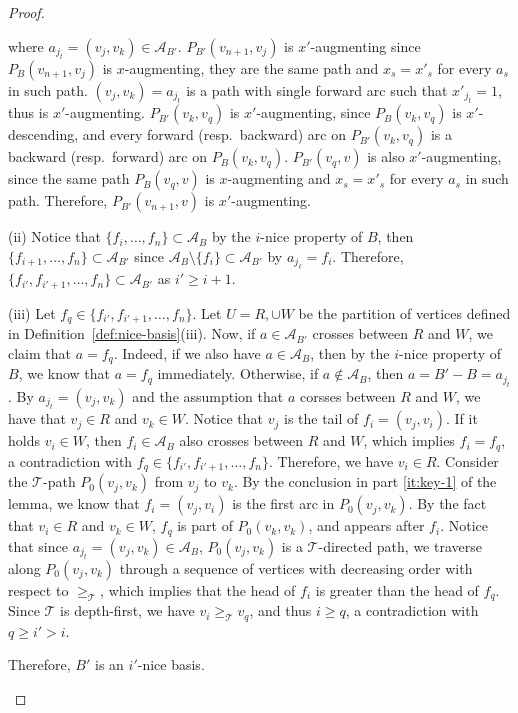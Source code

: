 \documentclass[11pt]{article}
\begin{document}
\begin{proof}
\begin{enumerate}
    where $a_{j_t}=(v_j,v_k)\in\mathcal{A}_{B'}$. $P_{B'}(v_{n+1},v_j)$ is $x'$-augmenting since $P_B(v_{n+1},v_j)$ is $x$-augmenting, they are the same path and $x_s=x'_s$ for every $a_s$ in such path. $(v_j,v_k)=a_{j_t}$ is a path with single forward arc such that $x'_{j_t}=1$, thus is $x'$-augmenting. $P_{B'}(v_k,v_q)$ is $x'$-augmenting, since $P_B(v_k,v_q)$ is $x'$-descending, and every forward (resp.~backward) arc on $P_{B'}(v_k,v_q)$ is a backward (resp.~forward) arc on $P_B(v_k,v_q)$. $P_{B'}(v_q,v)$ is also $x'$-augmenting, since the same path $P_B(v_q,v)$ is $x$-augmenting and $x_s=x'_s$ for every $a_s$ in such path. Therefore, $P_{B'}(v_{n+1},v)$ is $x'$-augmenting.
    




    




    (ii) Notice that $\{f_i,\dots,f_n\}\subset \mathcal{A}_B$ by the $i$-nice property of $B$, then $\{f_{i+1},\dots,f_n\}\subset \mathcal{A}_{B'}$ since $\mathcal{A}_B\setminus\{f_i\}\subset \mathcal{A}_{B'}$ by $a_{j_\ell}=f_i$. Therefore, $\{f_{i'},f_{i'+1},\dots,f_n\}\subset \mathcal{A}_{B'}$ as $i'\ge i+1$.

    (iii) Let $f_q\in\{f_{i'},f_{i'+1},\dots,f_n\}$. Let $U=R,\cup W$ be the partition of vertices defined in Definition~\ref{def:nice-basis}(iii). Now, if $a\in\mathcal{A}_{B'}$ crosses between $R$ and $W$, we claim that $a=f_q$. Indeed, if we also have $a\in\mathcal{A}_{B}$, then by the $i$-nice property of $B$, we know that $a=f_q$ immediately. Otherwise, if $a\notin\mathcal{A}_{B}$, then $a=B'-B=a_{j_t}$. By $a_{j_t}=(v_j,v_k)$ and the assumption that $a$ corsses between $R$ and $W$, we have that $v_j\in R$ and $v_k\in W$. Notice that $v_j$ is the tail of $f_i=(v_j,v_i)$. If it holds $v_i\in W$, then $f_i\in\mathcal{A}_B$ also crosses between $R$ and $W$, which implies $f_i=f_q$, a contradiction with $f_q\in\{f_{i'},f_{i'+1},\dots,f_n\}$. Therefore, we have $v_i\in R$. Consider the $\mathcal{T}$-path $P_0(v_j,v_k)$ from $v_j$ to $v_k$. By the conclusion in part \ref{it:key-1} of the lemma, we know that $f_i=(v_j,v_i)$ is the first arc in $P_0(v_j,v_k)$. By the fact that $v_i\in R$ and $v_k\in W$, $f_q$ is part of $P_0(v_k,v_k)$, and appears after $f_i$. Notice that since $a_{j_t}=(v_j,v_k)\in\mathcal{A}_B$, $P_0(v_j,v_k)$ is a $\mathcal{T}$-directed path, we traverse along $P_0(v_j,v_k)$ through a sequence of vertices with decreasing order with respect to $\ge_{\mathcal{T}}$, which implies that the head of $f_i$ is greater than the head of $f_q$. Since $\mathcal{T}$ is depth-first, we have $v_i\ge_{\mathcal{T}}v_q$, and thus $i\ge q$, a contradiction with $q\ge i'>i$. 

    Therefore, $B'$ is an $i'$-nice basis.
\end{enumerate}
\end{proof}
\end{document}
